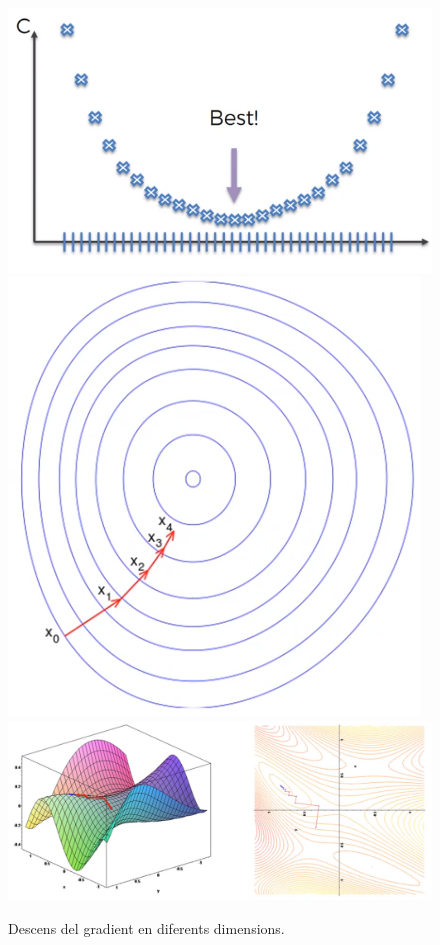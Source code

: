 \documentclass[12pt]{article}
\begin{document}
\begin{figure}[h!]
	\includegraphics[scale=0.25]{imatges/dg/dg1d.png}
	\includegraphics[scale=0.25]{imatges/dg/dg2d.png}
	\centering
	\includegraphics[scale=0.4]{imatges/dg/dg3d.png}
	\caption{Descens del gradient en diferents dimensions.}
\end{figure}
\end{document}
